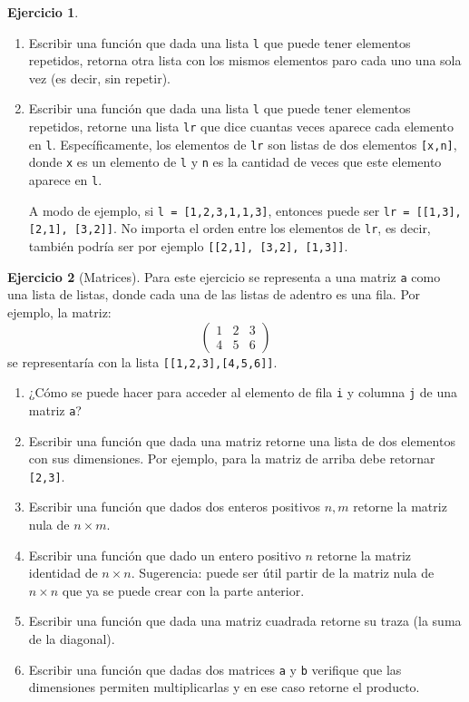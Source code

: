 \documentclass[a4paper,12pt]{book}
\theoremstyle{definition}
\newtheorem{ejercicio}{Ejercicio}
\begin{document}
	\begin{ejercicio}\label{ejer-2}
		\begin{enumerate}
			\item Escribir una función que  dada una lista {\tt l} que puede tener elementos repetidos, retorna otra lista con los mismos elementos paro cada uno una sola vez (es decir, sin repetir).
			
			\item Escribir una función que dada una lista {\tt l} que puede tener elementos repetidos, retorne una lista {\tt lr} que dice cuantas veces aparece cada elemento en {\tt l}. Específicamente, los elementos de {\tt lr} son listas de dos elementos {\tt [x,n]}, donde {\tt x} es un elemento de {\tt l} y {\tt n} es la cantidad de veces que este elemento aparece en {\tt l}.
			
			A modo de ejemplo, si {\tt l = [1,2,3,1,1,3]}, entonces puede ser {\tt lr = [[1,3], [2,1], [3,2]]}. No importa el orden entre los elementos de {\tt lr}, es decir, también podría ser por ejemplo {\tt [[2,1], [3,2], [1,3]]}.
		\end{enumerate}
	\end{ejercicio}
	
	\begin{ejercicio}[Matrices]
	Para este ejercicio se representa a una matriz {\tt a} como una lista de listas, donde cada una de las listas de adentro es una fila. Por ejemplo, la matriz:
	$$\begin{pmatrix}
		1 & 2 & 3\\
		4 & 5 & 6
	\end{pmatrix}$$
	se representaría con la lista {\tt [[1,2,3],[4,5,6]]}.
	\begin{enumerate}
		\item ¿Cómo se puede hacer para acceder al elemento de fila {\tt i} y columna {\tt j} de una matriz {\tt a}?
		
		\item Escribir una función que dada una matriz retorne una lista de dos elementos con sus dimensiones. Por ejemplo, para la matriz de arriba debe retornar {\tt [2,3]}.
		
		\item Escribir una función que dados dos enteros positivos $n,m$ retorne la matriz nula de $n\times m$.
		
		\item Escribir una función que dado un entero positivo $n$ retorne la matriz identidad de $n\times n$. Sugerencia: puede ser útil partir de la matriz nula de $n\times n$ que ya se puede crear con la parte anterior.
		
		\item Escribir una función que dada una matriz cuadrada retorne su traza (la suma de la diagonal).
		
		\item Escribir una función que dadas dos matrices {\tt a} y {\tt b} verifique que las dimensiones permiten multiplicarlas y en ese caso retorne el producto.
	\end{enumerate}
\end{ejercicio}
	
\end{document}
